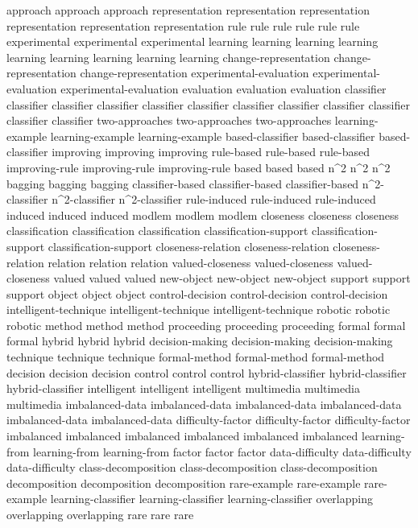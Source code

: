 approach	approach	approach	
representation	representation	representation	representation	representation	representation	
rule	rule	rule	rule	rule	rule	
experimental	experimental	experimental	
learning	learning	learning	learning	learning	learning	learning	learning	learning	
change-representation	change-representation	change-representation	
experimental-evaluation	experimental-evaluation	experimental-evaluation	
evaluation	evaluation	evaluation	
classifier	classifier	classifier	classifier	classifier	classifier	classifier	classifier	classifier	classifier	classifier	classifier	
two-approaches	two-approaches	two-approaches	
learning-example	learning-example	learning-example	
based-classifier	based-classifier	based-classifier	
improving	improving	improving	
rule-based	rule-based	rule-based	
improving-rule	improving-rule	improving-rule	
based	based	based	
n^2	n^2	n^2	
bagging	bagging	bagging	
classifier-based	classifier-based	classifier-based	
n^2-classifier	n^2-classifier	n^2-classifier	
rule-induced	rule-induced	rule-induced	
induced	induced	induced	
modlem	modlem	modlem	
closeness	closeness	closeness	
classification	classification	classification	
classification-support	classification-support	classification-support	
closeness-relation	closeness-relation	closeness-relation	
relation	relation	relation	
valued-closeness	valued-closeness	valued-closeness	
valued	valued	valued	
new-object	new-object	new-object	
support	support	support	
object	object	object	
control-decision	control-decision	control-decision	
intelligent-technique	intelligent-technique	intelligent-technique	
robotic	robotic	robotic	
method	method	method	
proceeding	proceeding	proceeding	
formal	formal	formal	
hybrid	hybrid	hybrid	
decision-making	decision-making	decision-making	
technique	technique	technique	
formal-method	formal-method	formal-method	
decision	decision	decision	
control	control	control	
hybrid-classifier	hybrid-classifier	hybrid-classifier	
intelligent	intelligent	intelligent	
multimedia	multimedia	multimedia	
imbalanced-data	imbalanced-data	imbalanced-data	imbalanced-data	imbalanced-data	imbalanced-data	
difficulty-factor	difficulty-factor	difficulty-factor	
imbalanced	imbalanced	imbalanced	imbalanced	imbalanced	imbalanced	
learning-from	learning-from	learning-from	
factor	factor	factor	
data-difficulty	data-difficulty	data-difficulty	
class-decomposition	class-decomposition	class-decomposition	
decomposition	decomposition	decomposition	
rare-example	rare-example	rare-example	
learning-classifier	learning-classifier	learning-classifier	
overlapping	overlapping	overlapping	
rare	rare	rare	
